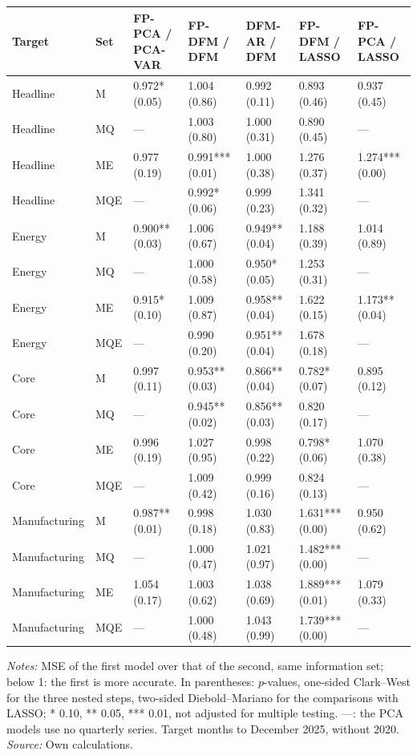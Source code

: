 \begin{threeparttable}
\begin{tabular}{lllllll}
\toprule
Target & Set & FP-PCA / PCA-VAR & FP-DFM / DFM & DFM-AR / DFM & FP-DFM / LASSO & FP-PCA / LASSO \\
\midrule
Headline & M & 0.972* (0.05) & 1.004 (0.86) & 0.992 (0.11) & 0.893 (0.46) & 0.937 (0.45) \\
Headline & MQ & --- & 1.003 (0.80) & 1.000 (0.31) & 0.890 (0.45) & --- \\
Headline & ME & 0.977 (0.19) & 0.991*** (0.01) & 1.000 (0.38) & 1.276 (0.37) & 1.274*** (0.00) \\
Headline & MQE & --- & 0.992* (0.06) & 0.999 (0.23) & 1.341 (0.32) & --- \\
Energy & M & 0.900** (0.03) & 1.006 (0.67) & 0.949** (0.04) & 1.188 (0.39) & 1.014 (0.89) \\
Energy & MQ & --- & 1.000 (0.58) & 0.950* (0.05) & 1.253 (0.31) & --- \\
Energy & ME & 0.915* (0.10) & 1.009 (0.87) & 0.958** (0.04) & 1.622 (0.15) & 1.173** (0.04) \\
Energy & MQE & --- & 0.990 (0.20) & 0.951** (0.04) & 1.678 (0.18) & --- \\
Core & M & 0.997 (0.11) & 0.953** (0.03) & 0.866** (0.04) & 0.782* (0.07) & 0.895 (0.12) \\
Core & MQ & --- & 0.945** (0.02) & 0.856** (0.03) & 0.820 (0.17) & --- \\
Core & ME & 0.996 (0.19) & 1.027 (0.95) & 0.998 (0.22) & 0.798* (0.06) & 1.070 (0.38) \\
Core & MQE & --- & 1.009 (0.42) & 0.999 (0.16) & 0.824 (0.13) & --- \\
Manufacturing & M & 0.987** (0.01) & 0.998 (0.18) & 1.030 (0.83) & 1.631*** (0.00) & 0.950 (0.62) \\
Manufacturing & MQ & --- & 1.000 (0.47) & 1.021 (0.97) & 1.482*** (0.00) & --- \\
Manufacturing & ME & 1.054 (0.17) & 1.003 (0.62) & 1.038 (0.69) & 1.889*** (0.01) & 1.079 (0.33) \\
Manufacturing & MQE & --- & 1.000 (0.48) & 1.043 (0.99) & 1.739*** (0.00) & --- \\
\bottomrule
\end{tabular}
\begin{tablenotes}[flushleft]\footnotesize
\item \textit{Notes:} MSE of the first model over that of the second, same information set; below 1: the first is more accurate. In parentheses: $p$-values, one-sided Clark--West for the three nested steps, two-sided Diebold--Mariano for the comparisons with LASSO; * 0.10, ** 0.05, *** 0.01, not adjusted for multiple testing. ---: the PCA models use no quarterly series. Target months to December 2025, without 2020. \textit{Source:} Own calculations.
\end{tablenotes}
\end{threeparttable}
